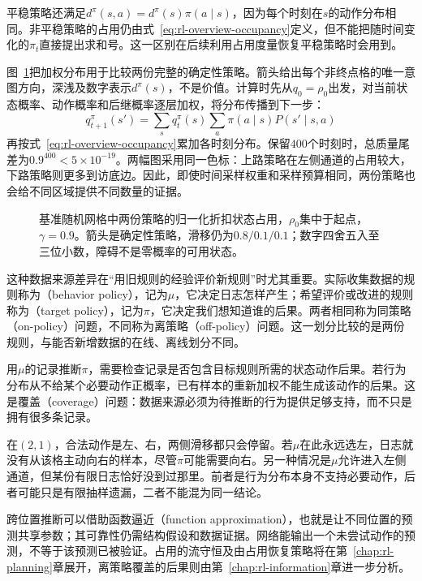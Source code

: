 平稳策略还满足$d^\pi(s,a)=d^\pi(s)\pi(a\mid s)$，因为每个时刻在$s$的动作分布相同。非平稳策略的占用仍由式~\eqref{eq:rl-overview-occupancy}定义，但不能把随时间变化的$\pi_t$直接提出求和号。这一区别在后续利用占用度量恢复平稳策略时会用到。

图~\ref{fig:rl-overview-occupancy}把加权分布用于比较两份完整的确定性策略。箭头给出每个非终点格的唯一意图方向，深浅及数字表示$d^\pi(s)$，不是价值。计算时先从$q_0=\rho_0$出发，对当前状态概率、动作概率和后继概率逐层加权，将分布传播到下一步：
\[
 q_{t+1}^\pi(s')=\sum_s q_t^\pi(s)
                    \sum_a\pi(a\mid s)P(s'\mid s,a)
\]
再按式~\eqref{eq:rl-overview-occupancy}累加各时刻分布。保留$400$个时刻时，总质量尾差为$0.9^{400}<5\times10^{-19}$。两幅图采用同一色标：上路策略在左侧通道的占用较大，下路策略则更多到访底边。因此，即使时间采样权重和采样预算相同，两份策略也会给不同区域提供不同数量的证据。

\begin{figure}[htbp]
  \centering
  
  \caption{基准随机网格中两份策略的归一化折扣状态占用，$\rho_0$集中于起点，$\gamma=0.9$。箭头是确定性策略，滑移仍为$0.8/0.1/0.1$；数字四舍五入至三位小数，障碍不是零概率的可用状态。}
  \label{fig:rl-overview-occupancy}
\end{figure}

这种数据来源差异在“用旧规则的经验评价新规则”时尤其重要。实际收集数据的规则称为（behavior policy），记为$\mu$，它决定日志怎样产生；希望评价或改进的规则称为（target policy），记为$\pi$，它决定我们想知道谁的后果。两者相同称为同策略（on-policy）问题，不同称为离策略（off-policy）问题。这一划分比较的是两份规则，与能否新增数据的在线、离线划分不同。

用$\mu$的记录推断$\pi$，需要检查记录是否包含目标规则所需的状态动作后果。若行为分布从不给某个必要动作正概率，已有样本的重新加权不能生成该动作的后果。这是覆盖（coverage）问题：数据来源必须为待推断的行为提供足够支持，而不只是拥有很多条记录。

在$(2,1)$，合法动作是左、右，两侧滑移都只会停留。若$\mu$在此永远选左，日志就没有从该格主动向右的样本，尽管$\pi$可能需要向右。另一种情况是$\mu$允许进入左侧通道，但某份有限日志恰好没到过那里。前者是行为分布本身不支持必要动作，后者可能只是有限抽样遗漏，二者不能混为同一结论。

跨位置推断可以借助函数逼近（function approximation），也就是让不同位置的预测共享参数；其可靠性仍需结构假设和数据证据。网络能输出一个未尝试动作的预测，不等于该预测已被验证。占用的流守恒及由占用恢复策略将在第~\ref{chap:rl-planning}章展开，离策略覆盖的后果则由第~\ref{chap:rl-information}章进一步分析。

